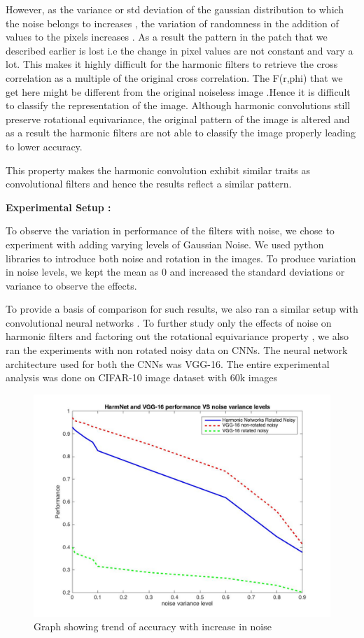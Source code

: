 \documentclass{article}
\begin{document}
However, as the variance or std deviation of the gaussian distribution to which the noise belongs to increases , the variation of randomness in the addition of values to the pixels increases . As a result the pattern in the patch that we described earlier is lost i.e the change in pixel values are not constant and vary a lot. This makes it highly difficult for the harmonic filters to retrieve the cross correlation as a multiple of the original cross correlation. The F(r,phi) that we get here might be different from the original noiseless image .Hence it is difficult to classify the representation of the image. Although harmonic convolutions still preserve rotational equivariance, the original pattern of the image is altered and as a result the harmonic filters are not able to classify the image properly leading to lower accuracy.

This property makes the harmonic convolution exhibit similar traits as convolutional filters and hence the results reflect a similar pattern.

\textbf{Experimental Setup :}

To observe the variation in performance of the filters with noise, we chose to experiment with adding varying levels of Gaussian Noise. We used python libraries to introduce both noise and rotation in the images. To produce variation in noise levels, we kept the mean as 0 and increased the standard deviations or variance to observe the effects. 

To provide a basis of comparison for such results, we also ran a similar setup with convolutional neural networks . To further study only the effects of noise on harmonic filters and factoring out the rotational equivariance property , we also ran the experiments with non rotated noisy data on CNNs. The neural network architecture used for both the CNNs was VGG-16.
The entire experimental analysis was done on CIFAR-10 image dataset with 60k images 

\begin{figure}[t!]
  \includegraphics[width=\linewidth]{vggAndHarmVsNoise.jpg}
  \caption{Graph showing trend of accuracy with increase in noise}
  \label{fig:NoiseGraph}
\end{figure}
 
\end{document}
